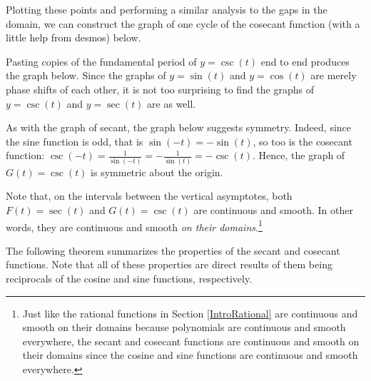 \documentclass{ximera}
\begin{document}
Plotting these points and performing a similar analysis to the gaps in the domain, we can construct the graph of one cycle of the cosecant function (with a little help from desmos) below.

\begin{center}
\end{center}


Pasting copies of the fundamental period of $y = \csc(t)$ end to end produces the graph below.  Since the graphs of  $y = \sin(t)$ and $y = \cos(t)$ are merely phase shifts of each other,  it is not too surprising to find the graphs of  $y = \csc(t)$ and $y = \sec(t)$ are as well. 



\begin{center}
\end{center}

As with the graph of secant, the graph below suggests symmetry.  Indeed, since the sine function is odd, that is $\sin(-t) = -\sin(t)$, so too is the cosecant function:  $\csc(-t) = \frac{1}{\sin(-t)} = -\frac{1}{\sin(t)} = -\csc(t)$.  Hence, the graph of $G(t) = \csc(t)$ is symmetric about the origin.



Note that, on the intervals between the vertical asymptotes, both $F(t) = \sec(t)$ and $G(t) = \csc(t)$ are continuous and smooth.  In other words, they are continuous and smooth \textit{on their domains}.\footnote{Just like the rational functions in Section \ref{IntroRational} are continuous and smooth on their domains because polynomials are continuous and smooth everywhere, the secant and cosecant functions are continuous and smooth on their domains since the cosine and sine functions are continuous and smooth everywhere.}  



The following theorem summarizes the properties of the secant and cosecant functions.  Note that all of these properties are direct results of them being reciprocals of the cosine and sine functions, respectively.



\end{document}
